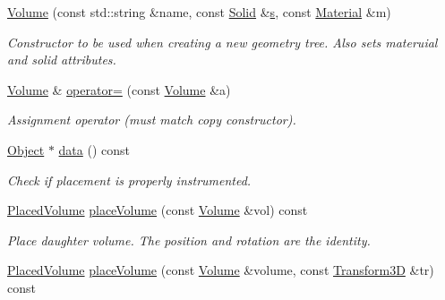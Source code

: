 \begin{DoxyCompactItemize}
\hyperlink{class_d_d4hep_1_1_geometry_1_1_volume_ac235438382cd2da68de97bcf2eafae08}{Volume} (const std::string \&name, const \hyperlink{class_d_d4hep_1_1_geometry_1_1_solid__type}{Solid} \&\hyperlink{_volumes_8cpp_a17ca6bfc8040d695d3cada22a4763d40}{s}, const \hyperlink{class_d_d4hep_1_1_geometry_1_1_material}{Material} \&m)
\begin{DoxyCompactList}\small\item\em Constructor to be used when creating a new geometry tree. Also sets materuial and solid attributes. \item\end{DoxyCompactList}\item 
\hyperlink{class_d_d4hep_1_1_geometry_1_1_volume}{Volume} \& \hyperlink{class_d_d4hep_1_1_geometry_1_1_volume_af071e34d365d16c7f7dfe5b2fe59d520}{operator=} (const \hyperlink{class_d_d4hep_1_1_geometry_1_1_volume}{Volume} \&a)
\begin{DoxyCompactList}\small\item\em Assignment operator (must match copy constructor). \item\end{DoxyCompactList}\item 
\hyperlink{class_d_d4hep_1_1_geometry_1_1_volume_extension}{Object} $\ast$ \hyperlink{class_d_d4hep_1_1_geometry_1_1_volume_aca15c04f667b12b142a300070c9b99ca}{data} () const 
\begin{DoxyCompactList}\small\item\em Check if placement is properly instrumented. \item\end{DoxyCompactList}\item 
\hyperlink{class_d_d4hep_1_1_geometry_1_1_placed_volume}{PlacedVolume} \hyperlink{class_d_d4hep_1_1_geometry_1_1_volume_a61a47d1aa7dfeb411f663d7425aad1e6}{placeVolume} (const \hyperlink{class_d_d4hep_1_1_geometry_1_1_volume}{Volume} \&vol) const 
\begin{DoxyCompactList}\small\item\em Place daughter volume. The position and rotation are the identity. \item\end{DoxyCompactList}\item 
\hyperlink{class_d_d4hep_1_1_geometry_1_1_placed_volume}{PlacedVolume} \hyperlink{class_d_d4hep_1_1_geometry_1_1_volume_a6dc8c06bdc867360d95e4db2ce71a471}{placeVolume} (const \hyperlink{class_d_d4hep_1_1_geometry_1_1_volume}{Volume} \&volume, const \hyperlink{namespace_d_d4hep_1_1_geometry_aeb4c0356d12fd7be49a0aae50514e64b}{Transform3D} \&tr) const 

\end{DoxyCompactItemize}
